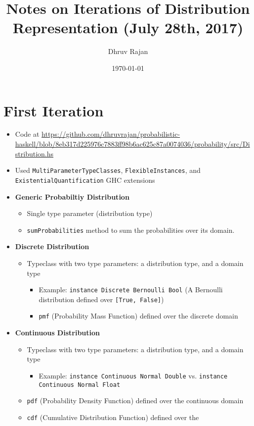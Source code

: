 \documentclass[11pt]{article}
\author{Dhruv Rajan}
\date{\today}
\title{Notes on Iterations of Distribution Representation (July 28th,  2017)}
\begin{document}
\maketitle
\tableofcontents


\section{First Iteration}
\label{sec-1}
\begin{itemize}
\item Code at \url{https://github.com/dhruvrajan/probabilistic-haskell/blob/8eb317d225976c7883ff98b6ac625c87a0074036/probability/src/Distribution.hs}
\item Used \texttt{MultiParameterTypeClasses}, \texttt{FlexibleInstances}, and
\texttt{ExistentialQuantification} GHC extensions
\item \textbf{Generic Probabiltiy Distribution}
\begin{itemize}
\item Single type parameter (distribution type)
\item \texttt{sumProbabilities} method to sum the probabilities over its domain.
\end{itemize}
\item \textbf{Discrete Distribution}
\begin{itemize}
\item Typeclass with two type parameters: a distribution type, and a domain type
\begin{itemize}
\item Example: \texttt{instance Discrete Bernoulli Bool} (A Bernoulli
distribution defined over \texttt{[True, False]})
\item \texttt{pmf} (Probability Mass Function) defined over the discrete
domain
\end{itemize}
\end{itemize}
\item \textbf{Continuous Distribution}
\begin{itemize}
\item Typeclass with two type parameters: a distribution type, and a domain type
\begin{itemize}
\item Example: \texttt{instance Continuous Normal Double} vs. \texttt{instance
	Continuous Normal Float}
\end{itemize}
\item \texttt{pdf} (Probability Density Function) defined over the continuous
domain
\item \texttt{cdf} (Cumulative Distribution Function) defined over the

\end{itemize}
\end{itemize}
\end{document}
